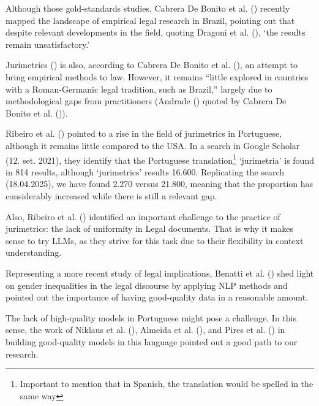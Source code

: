 \documentclass[
  12pt,
]{article}
\begin{document}
Although those gold-standards studies, Cabrera De Bonito et al.
() recently mapped
the landscape of empirical legal research in Brazil, pointing out that
despite relevant developments in the field, quoting Dragoni et al.
(), `the results remain
unsatisfactory.'

Jurimetrics () is also, according to Cabrera De Bonito et al.
(), an attempt to
bring empirical methods to law. However, it remains ``little explored in
countries with a Roman-Germanic legal tradition, such as Brazil,''
largely due to methodological gaps from practitioners (Andrade
() quoted by Cabrera De
Bonito et al. ()).

Ribeiro et al. () pointed to
a rise in the field of jurimetrics in Portuguese, although it remains
little compared to the USA. In a search in Google Scholar (12. set.
2021), they identify that the Portuguese translation\footnote{Important
  to mention that in Spanish, the translation would be spelled in the
  same way} `jurimetria' is found in 814 results, although `jurimetrics'
results 16.600. Replicating the search (18.04.2025), we have found 2.270
versus 21.800, meaning that the proportion has considerably increased
while there is still a relevant gap.

Also, Ribeiro et al. ()
identified an important challenge to the practice of jurimetrics: the
lack of uniformity in Legal documents. That is why it makes sense to try
LLMs, as they strive for this task due to their flexibility in context
understanding.

Representing a more recent study of legal implications, Benatti et al.
() shed light on gender
inequalities in the legal discourse by applying NLP methods and pointed
out the importance of having good-quality data in a reasonable amount.

The lack of high-quality models in Portuguese might pose a challenge. In
this sense, the work of Niklaus et al.
(), Almeida et al.
(), and Pires et al.
() in building good-quality models
in this language pointed out a good path to our research.
\end{document}
